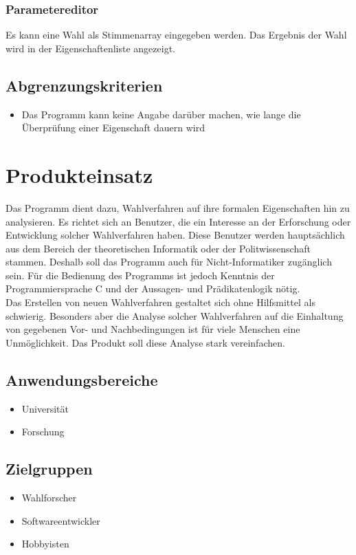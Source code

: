 \documentclass[a4paper]{scrreprt}
\begin{document}
\subsection{Parametereditor}
Es kann eine Wahl als Stimmenarray eingegeben werden. Das Ergebnis der Wahl wird in der Eigenschaftenliste angezeigt.


\section{Abgrenzungskriterien}
\begin{itemize}
\item Das Programm kann keine Angabe darüber machen, wie lange die Überprüfung einer Eigenschaft dauern wird
\end{itemize}



\chapter{Produkteinsatz}
Das Programm dient dazu, Wahlverfahren auf ihre formalen Eigenschaften hin zu analysieren. Es richtet sich an Benutzer, die ein Interesse an der Erforschung oder Entwicklung solcher Wahlverfahren haben. Diese Benutzer werden hauptsächlich aus dem Bereich der theoretischen Informatik oder der Politwissenschaft stammen. Deshalb soll das Programm auch für Nicht-Informatiker zugänglich sein. Für die Bedienung des Programms ist jedoch Kenntnis der Programmiersprache C und der Aussagen- und Prädikatenlogik nötig.\\
Das Erstellen von neuen Wahlverfahren gestaltet sich ohne Hilfsmittel als schwierig. Besonders aber die Analyse solcher Wahlverfahren auf die Einhaltung von gegebenen Vor- und Nachbedingungen ist für viele Menschen eine Unmöglichkeit. Das Produkt soll diese Analyse stark vereinfachen.\\

\section{Anwendungsbereiche}
\begin{itemize}
\item Universität
\item Forschung
\end{itemize}

\section{Zielgruppen}
\begin{itemize}
\item Wahlforscher
\item Softwareentwickler
\item Hobbyisten
\end{itemize}
\end{document}
